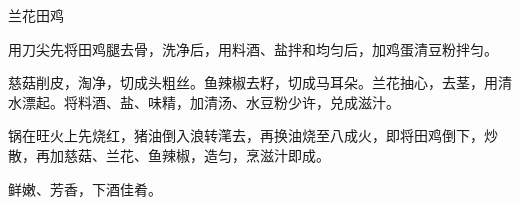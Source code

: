 %
%
%
%
%
%
%
\begin{recipe}{兰花田鸡}

\ingredients


\preparation

\step 用刀尖先将田鸡腿去骨，洗净后，用料酒、盐拌和均匀后，加鸡蛋清豆粉拌匀。

\step 慈菇削皮，淘净，切成头粗丝。鱼辣椒去籽，切成马耳朵。兰花抽心，去茎，用清
水漂起。将料酒、盐、味精，加清汤、水豆粉少许，兑成滋汁。

\step 锅在旺火上先烧红，猪油倒入浪转滗去，再换油烧至八成火，即将田鸡倒下，炒
散，再加慈菇、兰花、鱼辣椒，造匀，烹滋汁即成。

\features

鲜嫩、芳香，下酒佳肴。

\end{recipe}


